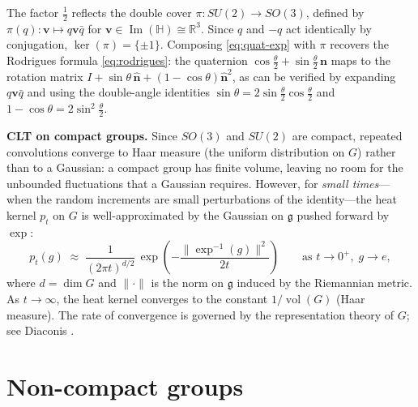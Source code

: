 \documentclass[12pt]{amsart}
\theoremstyle{definition}
\theoremstyle{remark}
\newcommand{\R}{\mathbb{R}}
\begin{document}
The factor $\frac{1}{2}$ reflects the double cover $\pi : SU(2) \to SO(3)$, defined by $\pi(q) : \mathbf{v} \mapsto q\mathbf{v}\bar{q}$ for $\mathbf{v} \in \operatorname{Im}(\mathbb{H}) \cong \R^3$. Since $q$ and $-q$ act identically by conjugation, $\ker(\pi) = \{\pm 1\}$. Composing \eqref{eq:quat-exp} with $\pi$ recovers the Rodrigues formula \eqref{eq:rodrigues}: the quaternion $\cos\frac{\theta}{2} + \sin\frac{\theta}{2}\,\mathbf{n}$ maps to the rotation matrix $I + \sin\theta\,\hat{\mathbf{n}} + (1-\cos\theta)\hat{\mathbf{n}}^2$, as can be verified by expanding $q\mathbf{v}\bar{q}$ and using the double-angle identities $\sin\theta = 2\sin\frac{\theta}{2}\cos\frac{\theta}{2}$ and $1 - \cos\theta = 2\sin^2\frac{\theta}{2}$.

\medskip\noindent\textbf{CLT on compact groups.}
Since $SO(3)$ and $SU(2)$ are compact, repeated convolutions converge to Haar measure (the uniform distribution on $G$) rather than to a Gaussian: a compact group has finite volume, leaving no room for the unbounded fluctuations that a Gaussian requires. However, for \emph{small times}---when the random increments are small perturbations of the identity---the heat kernel $p_t$ on $G$ is well-approximated by the Gaussian on $\mathfrak{g}$ pushed forward by $\exp$:
\[
p_t(g) \;\approx\; \frac{1}{(2\pi t)^{d/2}}\, \exp\!\left(-\frac{\|\exp^{-1}(g)\|^2}{2t}\right) \qquad \text{as } t \to 0^+,\; g \to e,
\]
where $d = \dim G$ and $\|\cdot\|$ is the norm on $\mathfrak{g}$ induced by the Riemannian metric. As $t \to \infty$, the heat kernel converges to the constant $1/\operatorname{vol}(G)$ (Haar measure). The rate of convergence is governed by the representation theory of $G$; see Diaconis \cite{Diaconis}.

\section{Non-compact groups}\label{sec:noncompact}
\end{document}
